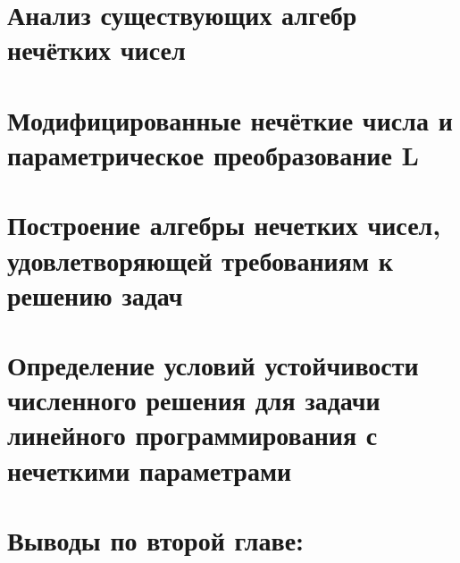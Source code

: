 
\section{Анализ существующих алгебр нечётких чисел}
\label{chapter2_1}


\section{Модифицированные нечёткие числа и параметрическое преобразование L}
\label{chapter2_2}


\section{Построение алгебры нечетких чисел, удовлетворяющей требованиям к решению задач} 
\label{chapter2_3}


\section{Определение условий устойчивости численного решения для задачи линейного программирования с нечеткими параметрами} 
\label{chapter2_4}


\newpage
\section*{Выводы по второй главе:} 
\label{chapter2_5}
